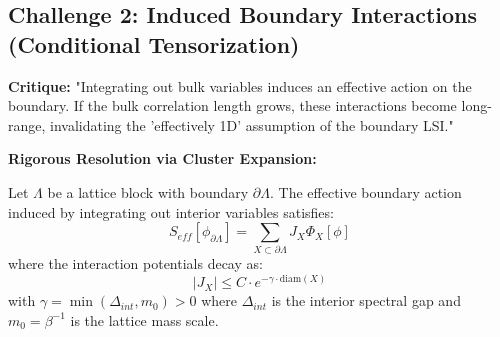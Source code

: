 \subsection{Challenge 2: Induced Boundary Interactions (Conditional Tensorization)}

\textbf{Critique:} "Integrating out bulk variables induces an effective action on the boundary. If the bulk correlation length grows, these interactions become long-range, invalidating the 'effectively 1D' assumption of the boundary LSI."

\textbf{Rigorous Resolution via Cluster Expansion:}

\begin{theorem}
\label{thm:induced-decay}
Let $\Lambda$ be a lattice block with boundary $\partial \Lambda$. The effective boundary action induced by integrating out interior variables satisfies:
\begin{equation}
S_{eff}[\phi_{\partial \Lambda}] = \sum_{X \subset \partial \Lambda} J_X \Phi_X[\phi]
\end{equation}
where the interaction potentials decay as:
\begin{equation}
|J_X| \leq C \cdot e^{-\gamma \cdot \mathrm{diam}(X)}
\end{equation}
with $\gamma = \min(\Delta_{int}, m_0) > 0$ where $\Delta_{int}$ is the interior spectral gap and $m_0 = \beta^{-1}$ is the lattice mass scale.
\end{theorem}

